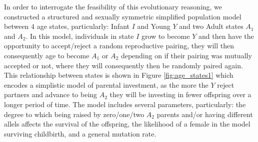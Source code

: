 In order to interrogate the feasibility of this evolutionary reasoning, we constructed a structured and sexually symmetric simplified population model between $4$ age states, particularly: Infant $I$ and Young $Y$ and two Adult states $A_1$ and $A_2$.
In this model, individuals in state $I$ grow to become $Y$ and then have the opportunity to accept/reject a random reproductive pairing, they will then consequently age to become $A_1$ or $A_2$ depending on if their pairing was mutually accepted or not, where they will consequently then be randomly paired again.
This relationship between states is shown in Figure \ref{fig:age_states1} which encodes a simplistic model of parental investment, as the more the $Y$ reject partners and advance to being $A_2$ they will be investing in fewer offspring over a longer period of time.
The model includes several parameters, particularly: the degree to which being raised by zero/one/two $A_2$ parents and/or having different allels affects the survival of the offspring, the likelihood of a female in the model surviving childbirth, and a general mutation rate.

